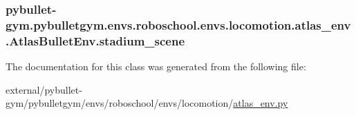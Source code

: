 \subsubsection[{\texorpdfstring{stadium\+\_\+scene}{stadium_scene}}]{\setlength{\rightskip}{0pt plus 5cm}pybullet-\/gym.\+pybulletgym.\+envs.\+roboschool.\+envs.\+locomotion.\+atlas\+\_\+env.\+Atlas\+Bullet\+Env.\+stadium\+\_\+scene}\hypertarget{classpybullet-gym_1_1pybulletgym_1_1envs_1_1roboschool_1_1envs_1_1locomotion_1_1atlas__env_1_1_atlas_bullet_env_a91349d2058811d1fb4fa4cdf63053917}{}\label{classpybullet-gym_1_1pybulletgym_1_1envs_1_1roboschool_1_1envs_1_1locomotion_1_1atlas__env_1_1_atlas_bullet_env_a91349d2058811d1fb4fa4cdf63053917}


The documentation for this class was generated from the following file\+:\begin{DoxyCompactItemize}
\item 
external/pybullet-\/gym/pybulletgym/envs/roboschool/envs/locomotion/\hyperlink{atlas__env_8py}{atlas\+\_\+env.\+py}\end{DoxyCompactItemize}
